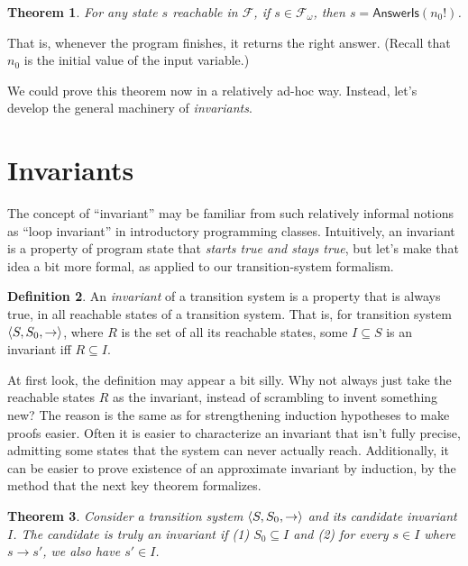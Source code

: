 \documentclass{amsbook}
\newtheorem{theorem}{Theorem}[chapter]
\theoremstyle{definition}
\newtheorem{definition}[theorem]{Definition}
\theoremstyle{remark}
\numberwithin{section}{chapter}
\numberwithin{equation}{chapter}
\begin{document}
\begin{theorem}\label{factorial_ok}
  For any state $s$ reachable in $\mathcal F$, if $s \in \mathcal F_\omega$, then $s = \mathsf{AnswerIs}(n_0!)$.
\end{theorem}

That is, whenever the program finishes, it returns the right answer.
(Recall that $n_0$ is the initial value of the input variable.)

We could prove this theorem now in a relatively ad-hoc way.
Instead, let's develop the general machinery of \emph{invariants}.


\section{Invariants}

The concept of ``invariant'' may be familiar from such relatively informal notions as ``loop invariant'' in introductory programming classes.
Intuitively, an invariant is a property of program state that \emph{starts true and stays true}, but let's make that idea a bit more formal, as applied to our transition-system formalism.

\newcommand{\invariants}[0]{}

\invariants
\begin{definition}
  An \emph{invariant} of a transition system is a property that is always true, in all reachable states of a transition system.  That is, for transition system ${\left \langle S, S_0, \to \right \rangle}$, where $R$ is the set of all its reachable states, some $I \subseteq S$ is an invariant iff $R \subseteq I$.
\end{definition}

At first look, the definition may appear a bit silly.
Why not always just take the reachable states $R$ as the invariant, instead of scrambling to invent something new?
The reason is the same as for strengthening induction hypotheses to make proofs easier.
Often it is easier to characterize an invariant that isn't fully precise, admitting some states that the system can never actually reach.
Additionally, it can be easier to prove existence of an approximate invariant by induction, by the method that the next key theorem formalizes.

\begin{theorem}\label{invariant_induction}
  Consider a transition system ${\left \langle S, S_0, \to \right \rangle}$ and its candidate invariant $I$.  The candidate is truly an invariant if (1) $S_0 \subseteq I$ and (2) for every $s \in I$ where $s \to s'$, we also have $s' \in I$.
\end{theorem}
\end{document}
